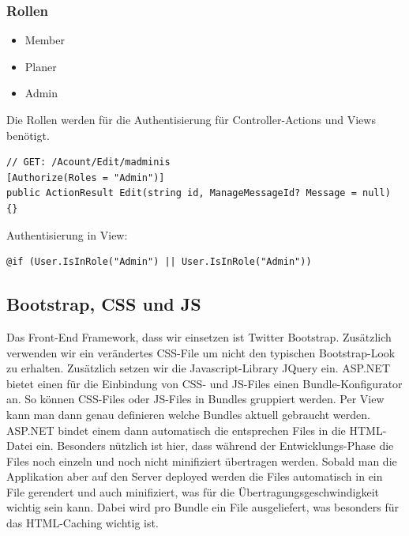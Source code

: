 		\subsubsection{Rollen}
			\begin{itemize}
				\item Member
				\item Planer
				\item Admin
			\end{itemize}
			Die Rollen werden für die Authentisierung für Controller-Actions und Views benötigt.
			\begin{lstlisting}[language=CSharp, caption=AccountController.cs, label=lst:accountcontroller, firstnumber=1]
// GET: /Acount/Edit/madminis
[Authorize(Roles = "Admin")]
public ActionResult Edit(string id, ManageMessageId? Message = null) {}
			\end{lstlisting}

			Authentisierung in View:
			\begin{lstlisting}[language=CSharp, caption=\_Layout.cshtml, label=lst:layoutauthentisierung, firstnumber=1]
@if (User.IsInRole("Admin") || User.IsInRole("Admin"))
			\end{lstlisting}


	\subsection{Bootstrap, CSS und JS}
		Das Front-End Framework, dass wir einsetzen ist Twitter Bootstrap. Zusätzlich verwenden wir ein verändertes CSS-File um nicht den typischen Bootstrap-Look zu erhalten.
		Zusätzlich setzen wir die Javascript-Library JQuery ein.
		ASP.NET bietet einen für die Einbindung von CSS- und JS-Files einen Bundle-Konfigurator an. So können CSS-Files oder JS-Files in Bundles gruppiert werden. Per View kann man dann genau definieren welche Bundles aktuell gebraucht werden. ASP.NET bindet einem dann automatisch die entsprechen Files in die HTML-Datei ein.
		Besonders nützlich ist hier, dass während der Entwicklungs-Phase die Files noch einzeln und noch nicht minifiziert übertragen werden. Sobald man die Applikation aber auf den Server deployed werden die Files automatisch in ein File gerendert und auch minifiziert, was für die Übertragungsgeschwindigkeit wichtig sein kann.
		Dabei wird pro Bundle ein File ausgeliefert, was besonders für das HTML-Caching wichtig ist.

